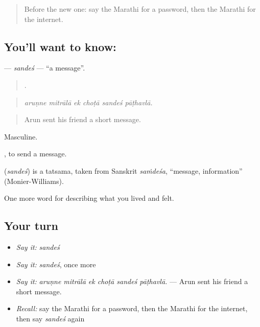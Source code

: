 \label{lesson:MR-C517-sandes}



\begin{quote}
Before the new one: say the Marathi for a password, then the Marathi for the internet.
\end{quote}

\subsection*{You'll want to know: }
\textbf{} — \emph{sandeś} — \textquotedblleft{}a message\textquotedblright{}.

\begin{quote}
     .
\end{quote}

\begin{quote}
\emph{aruṇne mitrālā ek choṭā sandeś pāṭhavlā.}
\end{quote}

\begin{quote}
Arun sent his friend a short message.
\end{quote}

Masculine.

 , to send a message.

\begin{cousinweb}
\textbf{} (\emph{sandeś}) is a tatsama, taken from Sanskrit \emph{saṁdeśa}, \textquotedblleft{}message, information\textquotedblright{} (Monier-Williams).
\end{cousinweb}

\begin{grammarlens}[title={What you've built}]
One more word for describing what you lived and felt.
\end{grammarlens}

\subsection*{Your turn}
\begin{itemize}
\raggedright
  \item \emph{Say it:} \emph{sandeś}
  \item \emph{Say it:} \emph{sandeś}, once more
  \item \emph{Say it:} \emph{aruṇne mitrālā ek choṭā sandeś pāṭhavlā.} — Arun sent his friend a short message.
  \item \emph{Recall:} say the Marathi for a password, then the Marathi for the internet, then say \emph{sandeś} again
\end{itemize}

